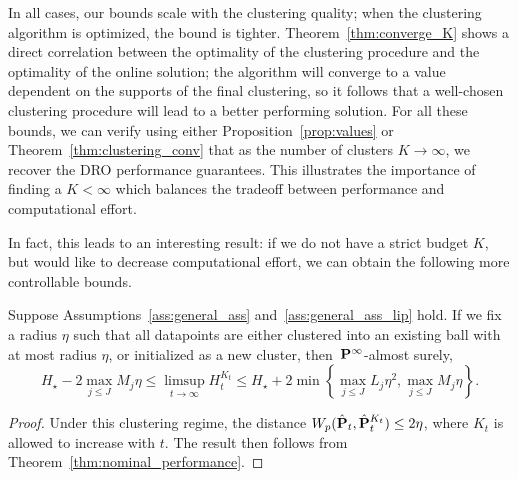 In all cases, our bounds scale with the clustering quality; when the clustering algorithm is optimized, the bound is tighter. 
Theorem~\ref{thm:converge_K} shows a direct correlation between the optimality of the clustering procedure and the optimality of the online solution; the algorithm will converge to a value dependent on the supports of the final clustering, so it follows that a well-chosen clustering procedure will lead to a better performing solution. 
For all these bounds, we can verify using either Proposition~\ref{prop:values} or Theorem~\ref{thm:clustering_conv} that as the number of clusters $K \to \infty$, 
we recover the \gls{DRO} performance guarantees.
This illustrates the importance of finding a $K < \infty$ which balances the tradeoff between performance and computational effort.

 
In fact, this leads to an interesting result: if we do not have a strict budget $K$, but would like to decrease computational effort, we can obtain the following more controllable bounds.

\begin{theorem} 
Suppose Assumptions~\ref{ass:general_ass} and~\ref{ass:general_ass_lip} hold. If we fix a radius $\eta$ such that 
all datapoints are either clustered into an existing ball with at most radius $\eta$, or initialized as a new cluster, then~${\mathbf P}^\infty$-almost surely,
$$  H_\star - 2\max_{j\leq J}M_j\eta \leq \limsup_{t \rightarrow \infty } H^{K_t}_t \leq H_\star + 2\min\left\{ {\max_{j \leq J}L_j}\eta^2, \max_{j\leq J}M_j\eta\right\}.$$
\end{theorem}
\begin{proof}
 Under this clustering regime, the distance $W_p(\hat{{\mathbf P}}_t,\hat{{\mathbf P}}^{K_t}_t) \leq 2\eta$, where $K_t$ is allowed to increase with $t$. The result then follows from Theorem~\ref{thm:nominal_performance}.
\end{proof}



